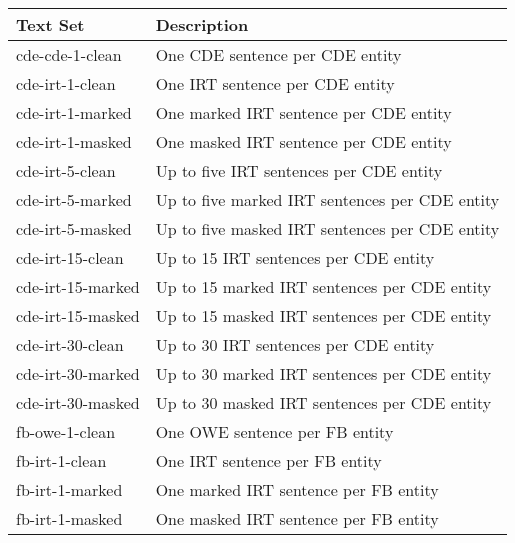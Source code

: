 \begin{tabular}{ l l }
    \toprule

    \multicolumn{1}{l}{\textbf{Text Set}} &
    \multicolumn{1}{l}{\textbf{Description}} \\

    \midrule

    cde-cde-1-clean   & One CDE sentence per CDE entity                \\

    \addlinespace

    cde-irt-1-clean   & One IRT sentence per CDE entity                \\
    cde-irt-1-marked  & One marked IRT sentence per CDE entity         \\
    cde-irt-1-masked  & One masked IRT sentence per CDE entity         \\

    \addlinespace

    cde-irt-5-clean   & Up to five IRT sentences per CDE entity        \\
    cde-irt-5-marked  & Up to five marked IRT sentences per CDE entity \\
    cde-irt-5-masked  & Up to five masked IRT sentences per CDE entity \\

    \addlinespace

    cde-irt-15-clean  & Up to 15 IRT sentences per CDE entity          \\
    cde-irt-15-marked & Up to 15 marked IRT sentences per CDE entity   \\
    cde-irt-15-masked & Up to 15 masked IRT sentences per CDE entity   \\

    \addlinespace

    cde-irt-30-clean  & Up to 30 IRT sentences per CDE entity          \\
    cde-irt-30-marked & Up to 30 marked IRT sentences per CDE entity   \\
    cde-irt-30-masked & Up to 30 masked IRT sentences per CDE entity   \\

    \midrule

    fb-owe-1-clean    & One OWE sentence per FB entity                 \\

    \addlinespace

    fb-irt-1-clean    & One IRT sentence per FB entity                 \\
    fb-irt-1-marked   & One marked IRT sentence per FB entity          \\
    fb-irt-1-masked   & One masked IRT sentence per FB entity          \\


\end{tabular}
